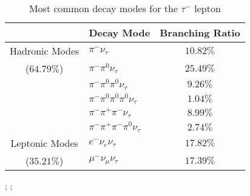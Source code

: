 \begin{table}[h] 
    \begin{minipage}{0.45\textwidth}
        \centering
 \begin{tabular}{|c|l|c|} \toprule
 \hline
       & Decay Mode & Branching Ratio  \\ \hline \hline
    Hadronic Modes  & $\pi^- \nu_\tau$  & $10.82\%$  \\
      	($64.79\%$) & $\pi^- \pi^0 \nu_\tau$ & $25.49\%$ \\
     				& $\pi^- \pi^0 \pi^0 \nu_\tau$  & $9.26\%$  \\
     				& $\pi^- \pi^0 \pi^0 \pi^0 \nu_\tau$  & $1.04\%$   \\
      				& $\pi^- \pi^+ \pi^- \nu_\tau$  & $8.99\%$      \\ \midrule
      				& $\pi^- \pi^+ \pi^- \pi^0 \nu_\tau$  & $2.74\%$  \\ \hline
    			    
    Leptonic Modes  & $e^- \nu_e \nu_\tau$ & $17.82\%$   \\
    	($35.21\%$)	& $\mu^- \nu_\mu \nu_\tau $  & $17.39\%$      \\ \midrule \hline
      				
     				
\end{tabular}
        \caption{\label{tab:taudecay}Most common decay modes for the $\tau^-$ lepton \cite{pdg}}

       
  
    \end{minipage}\hfill

   

    \begin{minipage}{0.45\textwidth}
        \centering
        ;
    ;
       \label{fig:verts}
    \end{minipage}

\end{table}

